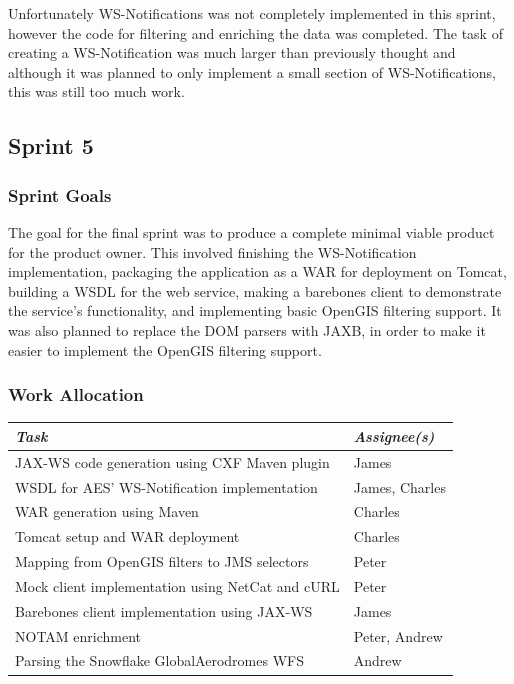 \documentclass[a4paper, 12pt, twoside]{article}
\begin{document}
Unfortunately WS-Notifications was not completely implemented in this sprint, however the code for filtering and enriching the data was completed. The task of creating a WS-Notification was much larger than previously thought and although it was planned to only implement a small section of WS-Notifications, this was still too much work.

\subsection{Sprint 5}
\label{sec:impl_sprint_5}

\subsubsection{Sprint Goals}

The goal for the final sprint was to produce a complete minimal viable product for the product owner. This involved finishing the WS-Notification implementation, packaging the application as a WAR for deployment on Tomcat, building a WSDL for the web service, making a barebones client to demonstrate the service's functionality, and implementing basic OpenGIS filtering support. It was also planned to replace the DOM parsers with JAXB, in order to make it easier to implement the OpenGIS filtering support.

\subsubsection{Work Allocation}

\begin{tabular}{l|l}
  \emph{Task} & \emph{Assignee(s)} \\ \hline
  JAX-WS code generation using CXF Maven plugin & James \\
  WSDL for AES' WS-Notification implementation & James, Charles \\
  WAR generation using Maven & Charles \\
  Tomcat setup and WAR deployment & Charles \\
  Mapping from OpenGIS filters to JMS selectors & Peter \\
  Mock client implementation using NetCat and cURL & Peter \\
  Barebones client implementation using JAX-WS & James \\
  NOTAM enrichment & Peter, Andrew \\
  Parsing the Snowflake GlobalAerodromes WFS & Andrew \\
\end{tabular}
\end{document}

